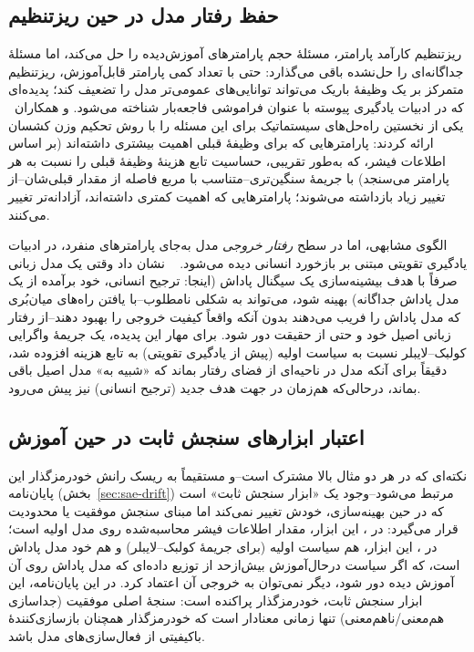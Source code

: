 \subsection{حفظ رفتار مدل در حین ریزتنظیم}
ریزتنظیم کارآمد پارامتر، مسئلهٔ حجم پارامترهای آموزش‌دیده را حل می‌کند، اما مسئلهٔ جداگانه‌ای را حل‌نشده باقی می‌گذارد: حتی با تعداد کمی پارامتر قابل‌آموزش، ریزتنظیم متمرکز بر یک وظیفهٔ باریک می‌تواند توانایی‌های عمومی‌تر مدل را تضعیف کند؛ پدیده‌ای که در ادبیات یادگیری پیوسته با عنوان فراموشی فاجعه‌بار
شناخته می‌شود.
و همکاران~\cite{kirkpatrick2017ewc}
یکی از نخستین راه‌حل‌های سیستماتیک برای این مسئله را با روش تحکیم وزن کشسان
ارائه کردند: پارامترهایی که برای وظیفهٔ قبلی اهمیت بیشتری داشته‌اند (بر اساس اطلاعات فیشر، که به‌طور تقریبی، حساسیت تابع هزینهٔ وظیفهٔ قبلی را نسبت به هر پارامتر می‌سنجد) با جریمهٔ سنگین‌تری--متناسب با مربع فاصله از مقدار قبلی‌شان--از تغییر زیاد بازداشته می‌شوند؛ پارامترهایی که اهمیت کمتری داشته‌اند، آزادانه‌تر تغییر می‌کنند.

الگوی مشابهی، اما در سطح \emph{رفتار خروجی} مدل به‌جای پارامترهای منفرد، در ادبیات یادگیری تقویتی مبتنی بر بازخورد انسانی
دیده می‌شود.
~\cite{ouyang2022instructgpt}
نشان داد وقتی یک مدل زبانی صرفاً با هدف بیشینه‌سازی یک سیگنال پاداش (اینجا: ترجیح انسانی، خود برآمده از یک مدل پاداش جداگانه) بهینه شود، می‌تواند به شکلی نامطلوب--با یافتن راه‌های میان‌بُری که مدل پاداش را فریب می‌دهند بدون آنکه واقعاً کیفیت خروجی را بهبود دهند--از رفتار زبانی اصیل خود و حتی از حقیقت دور شود.
برای مهار این پدیده، یک جریمهٔ واگرایی کولبک--لایبلر نسبت به سیاست اولیه (پیش از یادگیری تقویتی) به تابع هزینه افزوده شد، دقیقاً برای آنکه مدل در ناحیه‌ای از فضای رفتار بماند که «شبیه به» مدل اصیل باقی بماند، درحالی‌که هم‌زمان در جهت هدف جدید (ترجیح انسانی) نیز پیش می‌رود.

\subsection{اعتبار ابزارهای سنجش ثابت در حین آموزش}
نکته‌ای که در هر دو مثال بالا مشترک است--و مستقیماً به ریسک رانش خودرمزگذار این پایان‌نامه (بخش~\ref{sec:sae-drift}) مرتبط می‌شود--وجود یک «ابزار سنجش ثابت» است که در حین بهینه‌سازی، خودش تغییر نمی‌کند اما مبنای سنجش موفقیت یا محدودیت قرار می‌گیرد: در
، این ابزار، مقدار اطلاعات فیشر محاسبه‌شده روی مدل اولیه است؛ در
، این ابزار، هم سیاست اولیه (برای جریمهٔ کولبک--لایبلر) و هم خود مدل پاداش است، که اگر سیاست درحال‌آموزش بیش‌ازحد از توزیع داده‌ای که مدل پاداش روی آن آموزش دیده دور شود، دیگر نمی‌توان به خروجی آن اعتماد کرد. در این پایان‌نامه، این ابزار سنجش ثابت، خودرمزگذار پراکنده است: سنجهٔ اصلی موفقیت (جداسازی هم‌معنی/ناهم‌معنی) تنها زمانی معنادار است که خودرمزگذار همچنان بازسازی‌کنندهٔ باکیفیتی از فعال‌سازی‌های مدل باشد.

